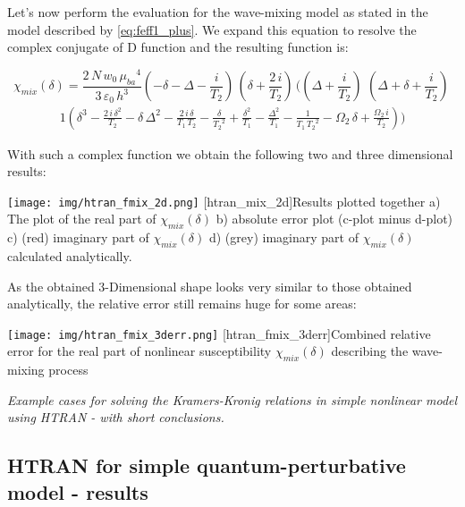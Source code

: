 \documentclass[12pt,twoside,a4paper]{article}
\numberwithin{equation}{subsection}
\numberwithin{figure}{subsection}
\begin{document}
Let's now perform the evaluation for the wave-mixing model as stated in the model described by \ref{eq:feff1_plus}. We expand this
equation to resolve the complex conjugate of D function and the resulting function is:

\begin{equation} \label{eq:htran_feffexp}
  {\chi_{mix}}(\delta ) = 
    \frac{2\,N\,{w_{0}}\,{\mu_{ba}}^{4}}{3\,\varepsilon_0\,h^{3}}( - \delta - \Delta - \frac {i}{{T_{2}}})\,(\delta +
    \frac{2\,i}{{T_{2}}})\,((\Delta + \frac {i}{{T_{2}}})\,\,(\Delta + \delta + \frac {i}{{T_{2}}})\,
\end{equation}
\begin{alignat*}{1}
  (\delta ^{3} - \frac
    {2\,i\,\delta ^{2}}{{T _{2}}} - \delta \,\Delta ^{2} - \frac {2\,i\,\delta }{{T_{1}}\,{T_{2}}} - \frac {\delta }{{T_{2}}^{2}} +
    \frac {\delta ^{2}}{{T_{1 }}} - \frac {\Delta ^{2}}{{T_{1}}} - \frac {1}{{T_{1}}\,{T_{2}}^{2}} - {\Omega_{2}}\,\delta  + \frac
    {{\Omega_{2}}\,i}{{T_{2}}}) )
\end{alignat*}

With such a complex function we obtain the following two and three dimensional results:
\begin{center}
  \texttt{[image: img/htran\_fmix\_2d.png]}
  [htran_mix_2d]{Results plotted together
   a) The plot of the real part of ${\chi_{mix}}(\delta )$
   b) absolute error plot (c-plot minus d-plot)
   c) (red) imaginary part of  ${\chi_{mix}}(\delta )$
   d) (grey) imaginary part of ${\chi_{mix}}(\delta )$ calculated analytically.
   \label{fig:htran_mix_2d} 
   }
\end{center}

As the obtained 3-Dimensional shape looks very similar to those obtained analytically, the relative error still remains huge for some
areas:

\begin{center}
  \texttt{[image: img/htran\_fmix\_3derr.png]}
  [htran_fmix_3derr]{Combined relative error for the real part of nonlinear susceptibility ${\chi_{mix}}(\delta
  )$ describing the wave-mixing process}
  \label{htran_fmix_3derr}
\end{center}

\textit{Example cases for solving the Kramers-Kronig relations in simple nonlinear model using HTRAN - with short conclusions.}

\subsection{HTRAN for simple quantum-perturbative model - results} \label{chap:htran_quantum}
\end{document}
